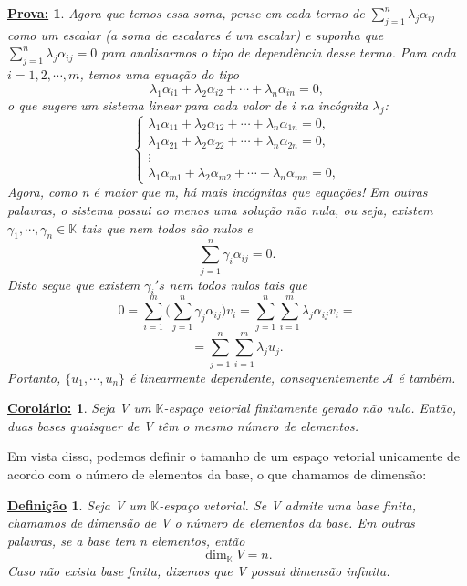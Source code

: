 \documentclass{article}
\newtheorem*{def*}{\underline{Defini\c c\~ao}}
\newtheorem*{corol*}{\underline{Corol\'ario:}}
\newtheorem*{proof*}{\underline{Prova:}}
\begin{document}
\begin{proof*}
	Agora que temos essa soma, pense em cada termo de $\sum_{j=1}^{n}\lambda_{j}\alpha_{ij}$ como um escalar (a soma de escalares \'e um escalar) e suponha que
	$\sum_{j=1}^{n}\lambda_{j}\alpha_{ij} = 0$ para analisarmos o tipo de depend\^encia desse termo. Para cada $i = 1, 2, \cdots, m$, temos
	uma equa\c c\~ao do tipo
	$$
		\lambda_{1}\alpha_{i1} + \lambda_{2}\alpha_{i2} + \cdots + \lambda_{n}\alpha_{in} = 0,
	$$
	o que sugere um sistema linear para cada valor de i na inc\'ognita $\lambda_{j}$:
	$$
		\left\{\begin{array}{ll}
			\lambda_{1}\alpha_{11} + \lambda_{2}\alpha_{12} + \cdots + \lambda_{n}\alpha_{1n} = 0, \\
			\lambda_{1}\alpha_{21} + \lambda_{2}\alpha_{22} + \cdots + \lambda_{n}\alpha_{2n} = 0, \\
			\vdots                                                                                 \\
			\lambda_{1}\alpha_{m1} + \lambda_{2}\alpha_{m2} + \cdots + \lambda_{n}\alpha_{mn} = 0,
		\end{array}\right.
	$$
	Agora, como n \'e maior que m, h\'a mais inc\'ognitas que equa\c c\~oes! Em outras palavras, o sistema possui ao menos
	uma solu\c c\~ao n\~ao nula, ou seja, existem $\gamma_1, \cdots, \gamma_n\in\mathbb{K}$ tais que nem todos s\~ao nulos e
	$$
		\sum_{j=1}^{n} \gamma_{i}\alpha_{ij} = 0.
	$$
	Disto segue que existem $\gamma_{i}'s$ nem todos nulos tais que
	$$
		0 = \sum_{i=1}^{m}\biggl(\sum_{j=1}^{n}\gamma_{j}\alpha_{ij}\biggr)v_{i} = \sum_{j=1}^{n}\sum_{i=1}^{m}\lambda_{j}\alpha_{ij}v_{i} =
	$$
	$$
		= \sum_{j=1}^{n}\sum_{i=1}^{m}\lambda_{j}u_{j}.
	$$
	Portanto, $\{u_1, \cdots, u_n\}$ \'e linearmente dependente, consequentemente $\mathcal{A}$ \'e tamb\'em.
\end{proof*}
\begin{corol*}
	Seja V um $\mathbb{K}$-espa\c co vetorial finitamente gerado n\~ao nulo. Ent\~ao, duas bases quaisquer de V t\^em
	o mesmo n\'umero de elementos.
\end{corol*}

Em vista disso, podemos definir o tamanho de um espa\c co vetorial unicamente de acordo com o n\'umero de elementos
da base, o que chamamos de dimens\~ao:

\begin{def*}
	Seja V um $\mathbb{K}$-espa\c co vetorial. Se V admite uma base finita, chamamos de dimens\~ao de V o n\'umero
	de elementos da base. Em outras palavras, se a base tem n elementos, ent\~ao
	$$
		\dim_{\mathbb{K}}V = n.
	$$
	Caso n\~ao exista base finita, dizemos que V possui dimens\~ao infinita.
\end{def*}
\end{document}
